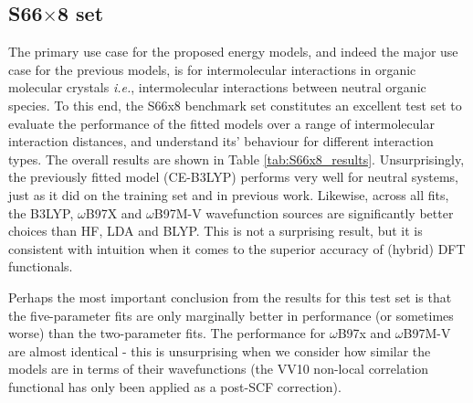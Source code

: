 \documentclass[preprint]{iucr}              %
\begin{document}
\subsection{S66$\times$8 set}

The primary use case for the proposed energy models, and indeed the major use case for the previous models, is for intermolecular interactions in organic molecular crystals \textit{i.e.}, intermolecular
interactions between neutral organic species. To this end, the S66x8 benchmark
set \cite{Rezac2011a,Rezac2011b,Brauer2016} constitutes an excellent test set to evaluate the performance of the fitted models over a range of intermolecular interaction distances, and understand its' behaviour for different interaction types. The overall results are shown in Table \ref{tab:S66x8_results}. Unsurprisingly, the previously fitted model (CE-B3LYP) performs very well for neutral systems, just as it did on the training set and in previous work. Likewise, across all fits, the B3LYP, $\omega$B97X and $\omega$B97M-V wavefunction sources are significantly better choices than HF, LDA and BLYP. This is not a surprising result, but it is consistent with intuition when it comes to the superior accuracy of (hybrid) DFT functionals.

Perhaps the most important conclusion from the results for this test set is that the five-parameter fits are only marginally better in performance (or sometimes worse) than the two-parameter fits.
The performance for $\omega$B97x and $\omega$B97M-V are almost identical - this is unsurprising when we consider how similar the models are in terms of their wavefunctions (the VV10 non-local correlation functional
has only been applied as a post-SCF correction).
\end{document}
